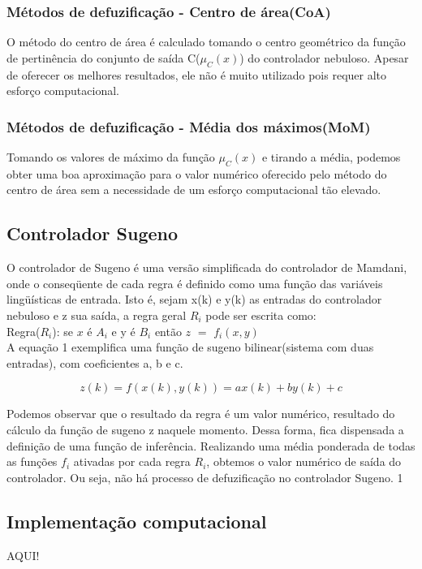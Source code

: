 \documentclass[conference]{IEEEtran}
\begin{document}
\subsubsection{Métodos de defuzificação - Centro de área(CoA)}

O método do centro de área é calculado tomando o centro geométrico da função de pertinência do conjunto de saída C($\mu_C(x)$) do controlador nebuloso. Apesar de oferecer os melhores resultados, ele não é muito utilizado pois requer alto esforço computacional.

\subsubsection{Métodos de defuzificação - Média dos máximos(MoM)}

Tomando os valores de máximo da função $\mu_C(x)$ e tirando a média, podemos obter uma boa aproximação para o valor numérico oferecido pelo método do centro de área sem a necessidade de um esforço computacional tão elevado.


\subsection{Controlador Sugeno}

O controlador de Sugeno é uma versão simplificada do controlador de Mamdani, onde o conseqüente de cada regra é definido como uma função das variáveis lingüísticas de entrada. Isto é, sejam x(k) e y(k) as entradas do controlador nebuloso e z sua saída, a regra geral $R_i$ pode ser escrita como:\\
Regra($R_i$): se $x$ é $A_i$ e y é $B_i$ então $z$ $=$ $f_i(x,y)$\\
A equação 1 exemplifica uma função de sugeno bilinear(sistema com duas entradas), com coeficientes a, b e c.

\begin{equation}
z(k) = f(x(k),y(k)) = ax(k) + by(k) + c
\end{equation}

Podemos observar que o resultado da regra  é um valor numérico, resultado do cálculo da função de sugeno z naquele momento. Dessa forma, fica dispensada a definição de uma função de inferência. Realizando uma média ponderada de todas as funções $f_i$ ativadas por cada regra $R_i$, obtemos o valor numérico de saída do controlador. Ou seja, não há processo de defuzificação no controlador Sugeno.
1
\subsection{Implementação computacional} AQUI!
\end{document}
